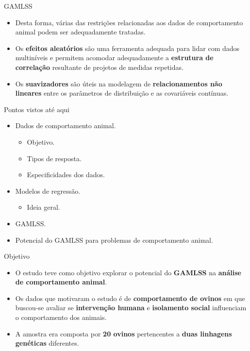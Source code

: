 \documentclass[
  ignorenonframetext,
  serif,
  professionalfont,
  usenames,
  dvipsnames,
  aspectratio = 169]{beamer}
\providecommand{\tightlist}{%
  \setlength{\itemsep}{0pt}\setlength{\parskip}{0pt}}
\renewcommand{\tightlist}{%
  \setlength{\itemsep}{0\baselineskip}
  \setlength{\parskip}{0.25\baselineskip}
}
\def\beginAHalfColumn{\begin{minipage}{0.49\textwidth}}%
\def\endColumns{\end{minipage}}%
\begin{document}
\begin{frame}{GAMLSS}
\protect\hypertarget{gamlss-1}{}
\begin{itemize}
\item
  Desta forma, várias das restrições relacionadas aos dados de
  comportamento animal podem ser adequadamente tratadas.
\item
  Os \textbf{efeitos aleatórios} são uma ferramenta adequada para lidar
  com dados multiníveis e permitem acomodar adequadamente a
  \textbf{estrutura de correlação} resultante de projetos de medidas
  repetidas.
\item
  Os \textbf{suavizadores} são úteis na modelagem de
  \textbf{relacionamentos não lineares} entre os parâmetros de
  distribuição e as covariáveis contínuas.
\end{itemize}
\end{frame}

\begin{frame}{Pontos vistos até aqui}
\protect\hypertarget{pontos-vistos-atuxe9-aqui}{}
\beginAHalfColumn

\begin{itemize}
\tightlist
\item
  Dados de comportamento animal.

  \begin{itemize}
  \tightlist
  \item
    Objetivo.
  \item
    Tipos de resposta.
  \item
    Especificidades dos dados.
  \end{itemize}
\item
  Modelos de regressão.

  \begin{itemize}
  \tightlist
  \item
    Ideia geral.
  \end{itemize}
\item
  GAMLSS.
\item
  Potencial do GAMLSS para problemas de comportamento animal.
\end{itemize}

\endColumns
\beginAHalfColumn

\endColumns
\end{frame}

\begin{frame}{Objetivo}
\protect\hypertarget{objetivo}{}
\begin{itemize}
\item
  O estudo teve como objetivo explorar o potencial do \textbf{GAMLSS} na
  \textbf{análise de comportamento animal}.
\item
  Os dados que motivaram o estudo é de \textbf{comportamento de ovinos}
  em que buscou-se avaliar se \textbf{intervenção humana} e
  \textbf{isolamento social} influenciam o comportamento dos animais.
\item
  A amostra era composta por \textbf{20 ovinos} pertencentes a
  \textbf{duas linhagens genéticas} diferentes.
\end{itemize}
\end{frame}
\end{document}
